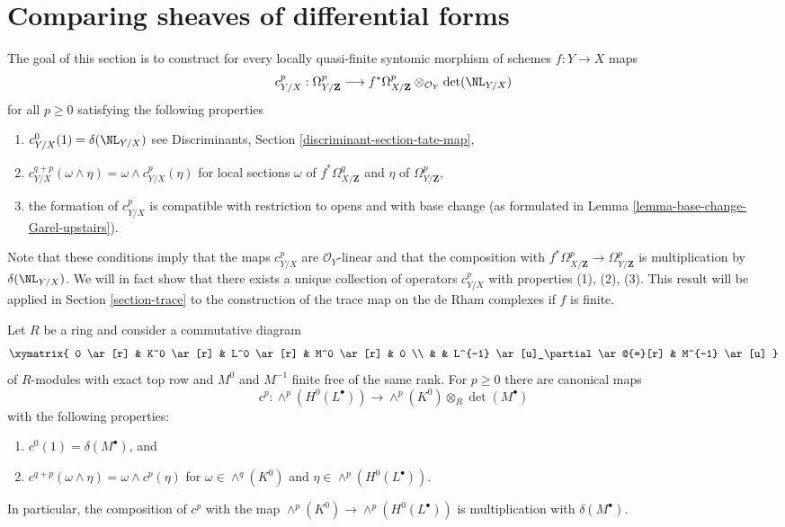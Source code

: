 \section{Comparing sheaves of differential forms}
\label{section-quasi-finite-syntomic}

\noindent
The goal of this section is to construct for every locally quasi-finite
syntomic morphism of schemes $f : Y \to X$ maps
$$
c^p_{Y/X} :
\Omega^p_{Y/\mathbf{Z}}
\longrightarrow
f^*\Omega^p_{X/\mathbf{Z}} \otimes_{\mathcal{O}_Y} \det(\NL_{Y/X})
$$
for all $p \geq 0$ satisfying the following properties
\begin{enumerate}
\item
\label{item-degree-zero}
$c_{Y/X}^0(1) = \delta(\NL_{Y/X})$ see
Discriminants, Section \ref{discriminant-section-tate-map},
\item
\label{item-multiplicative}
$c_{Y/X}^{q + p}(\omega \wedge \eta) = \omega \wedge c_{Y/X}^p(\eta)$
for local sections $\omega$ of $f^*\Omega^q_{X/\mathbf{Z}}$
and $\eta$ of $\Omega^p_{Y/\mathbf{Z}}$,
\item
\label{item-base-change}
the formation of $c^p_{Y/X}$ is compatible with restriction to opens
and with base change
(as formulated in Lemma \ref{lemma-base-change-Garel-upstairs}).
\end{enumerate}
Note that these conditions imply that the maps $c^p_{Y/X}$ are
$\mathcal{O}_Y$-linear and that the composition with
$f^*\Omega^p_{X/\mathbf{Z}} \to \Omega^p_{Y/\mathbf{Z}}$
is multiplication by $\delta(\NL_{Y/X})$.
We will in fact show that there exists a unique collection of operators
$c^p_{Y/X}$ with properties (1), (2), (3). This result will be applied in
Section \ref{section-trace} to the construction of the trace map on
the de Rham complexes if $f$ is finite.

\begin{lemma}
\label{lemma-funny-map}
Let $R$ be a ring and consider a commutative diagram
$$
\xymatrix{
0 \ar[r] &
K^0 \ar[r] &
L^0 \ar[r] &
M^0 \ar[r] & 0 \\
& & L^{-1} \ar[u]_\partial \ar@{=}[r] &
M^{-1} \ar[u]
}
$$
of $R$-modules with exact top row and $M^0$ and $M^{-1}$
finite free of the same rank. For $p \geq 0$ there are canonical maps
$$
c^p : 
\wedge^p(H^0(L^\bullet))
\longrightarrow
\wedge^p(K^0) \otimes_R \det(M^\bullet)
$$
with the following properties:
\begin{enumerate}
\item $c^0(1) = \delta(M^\bullet)$, and
\item $c^{q + p}(\omega \wedge \eta) = \omega \wedge c^p(\eta)$
for $\omega \in \wedge^q(K^0)$ and $\eta \in \wedge^p(H^0(L^\bullet))$.
\end{enumerate}
In particular, the composition of $c^p$ with the map
$\wedge^p(K^0) \to \wedge^p(H^0(L^\bullet))$ is multiplication
with $\delta(M^\bullet)$.
\end{lemma}

